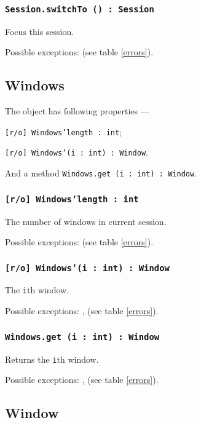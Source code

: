 \subsubsection{\texttt{Session.switchTo () : Session}}

Focus this session.

Possible exceptions:  (see table \ref{errors}).

\subsection{Windows}

The object \windows{} has following properties —
\begin{icItems}
	\item \texttt{[r/o] Windows'length : int};
	\item \texttt{[r/o] Windows'(i : int) : Window}.
\end{icItems}

And a method \texttt{Windows.get (i : int) : Window}.

\subsubsection{\texttt{[r/o] Windows'length : int}}

The number of windows in current session.

Possible exceptions:  (see table \ref{errors}).

\subsubsection{\texttt{[r/o] Windows'(i : int) : Window}}

The \texttt{i}th window.

Possible exceptions: ,  (see table \ref{errors}).

\subsubsection{\texttt{Windows.get (i : int) : Window}}

Returns the \texttt{i}th window.

Possible exceptions: ,  (see table \ref{errors}).

\subsection{Window}

